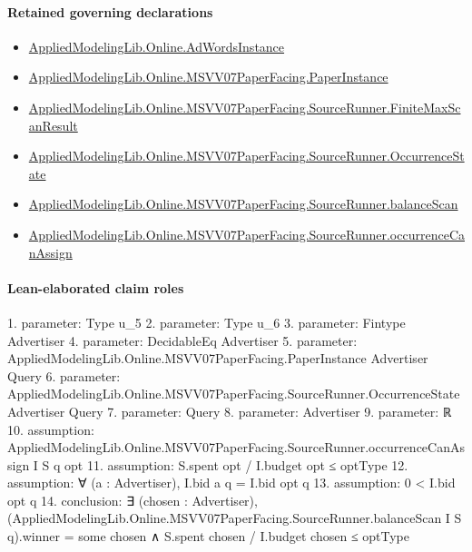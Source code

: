 \documentclass[10pt]{article}
\begin{document}
\paragraph{Retained governing declarations}
\begin{itemize}\raggedright
\item \hyperlink{governing-declaration-e5ce49672bf26ab1}{Applied\allowbreak{}Modeling\allowbreak{}Lib.\allowbreak{}Online.\allowbreak{}Ad\allowbreak{}Words\allowbreak{}Instance}
\item \hyperlink{governing-declaration-11907576ec71eeb5}{Applied\allowbreak{}Modeling\allowbreak{}Lib.\allowbreak{}Online.\allowbreak{}MSVV07\allowbreak{}Paper\allowbreak{}Facing.\allowbreak{}Paper\allowbreak{}Instance}
\item \hyperlink{governing-declaration-ebb7db2383e5a26e}{Applied\allowbreak{}Modeling\allowbreak{}Lib.\allowbreak{}Online.\allowbreak{}MSVV07\allowbreak{}Paper\allowbreak{}Facing.\allowbreak{}Source\allowbreak{}Runner.\allowbreak{}Finite\allowbreak{}Max\allowbreak{}Scan\allowbreak{}Result}
\item \hyperlink{governing-declaration-2eff7815f49c1d41}{Applied\allowbreak{}Modeling\allowbreak{}Lib.\allowbreak{}Online.\allowbreak{}MSVV07\allowbreak{}Paper\allowbreak{}Facing.\allowbreak{}Source\allowbreak{}Runner.\allowbreak{}Occurrence\allowbreak{}State}
\item \hyperlink{governing-declaration-475645bad654a676}{Applied\allowbreak{}Modeling\allowbreak{}Lib.\allowbreak{}Online.\allowbreak{}MSVV07\allowbreak{}Paper\allowbreak{}Facing.\allowbreak{}Source\allowbreak{}Runner.\allowbreak{}balance\allowbreak{}Scan}
\item \hyperlink{governing-declaration-54a700f2397309bc}{Applied\allowbreak{}Modeling\allowbreak{}Lib.\allowbreak{}Online.\allowbreak{}MSVV07\allowbreak{}Paper\allowbreak{}Facing.\allowbreak{}Source\allowbreak{}Runner.\allowbreak{}occurrence\allowbreak{}Can\allowbreak{}Assign}
\end{itemize}
\paragraph{Lean-elaborated claim roles}\begin{ReviewVerbatim}
1. parameter: Type u_5
2. parameter: Type u_6
3. parameter: Fintype Advertiser
4. parameter: DecidableEq Advertiser
5. parameter: AppliedModelingLib.Online.MSVV07PaperFacing.PaperInstance Advertiser Query
6. parameter: AppliedModelingLib.Online.MSVV07PaperFacing.SourceRunner.OccurrenceState Advertiser Query
7. parameter: Query
8. parameter: Advertiser
9. parameter: ℝ
10. assumption: AppliedModelingLib.Online.MSVV07PaperFacing.SourceRunner.occurrenceCanAssign I S q opt
11. assumption: S.spent opt / I.budget opt ≤ optType
12. assumption: ∀ (a : Advertiser), I.bid a q = I.bid opt q
13. assumption: 0 < I.bid opt q
14. conclusion: ∃ (chosen : Advertiser),
  (AppliedModelingLib.Online.MSVV07PaperFacing.SourceRunner.balanceScan I S q).winner = some chosen ∧
    S.spent chosen / I.budget chosen ≤ optType
\end{ReviewVerbatim}
\end{document}
